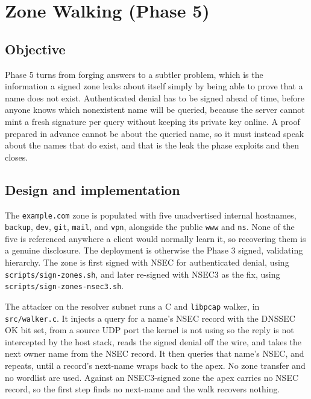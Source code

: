 \documentclass[11pt]{article}
\begin{document}
\clearpage

\section{Zone Walking (Phase 5)}

\subsection{Objective}

Phase 5 turns from forging answers to a subtler problem, which is the information a
signed zone leaks about itself simply by being able to prove that a name does not
exist. Authenticated denial has to be signed ahead of time, before anyone knows
which nonexistent name will be queried, because the server cannot mint a fresh
signature per query without keeping its private key online. A proof prepared in
advance cannot be about the queried name, so it must instead speak about the names
that do exist, and that is the leak the phase exploits and then closes.

\subsection{Design and implementation}

The \texttt{example.com} zone is populated with five unadvertised internal
hostnames, \texttt{backup}, \texttt{dev}, \texttt{git}, \texttt{mail}, and
\texttt{vpn}, alongside the public \texttt{www} and \texttt{ns}. None of the five
is referenced anywhere a client would normally learn it, so recovering them is a
genuine disclosure. The deployment is otherwise the Phase 3 signed, validating
hierarchy. The zone is first signed with NSEC for authenticated denial, using
\texttt{scripts/sign-zones.sh}, and later re-signed with NSEC3 as the fix, using
\texttt{scripts/sign-zones-nsec3.sh}.

The attacker on the resolver subnet runs a C and \texttt{libpcap} walker, in
\texttt{src/walker.c}. It injects a query for a name's NSEC record with the DNSSEC
OK bit set, from a source UDP port the kernel is not using so the reply is not
intercepted by the host stack, reads the signed denial off the wire, and takes the
next owner name from the NSEC record. It then queries that name's NSEC, and
repeats, until a record's next-name wraps back to the apex. No zone transfer and no
wordlist are used. Against an NSEC3-signed zone the apex carries no NSEC record, so
the first step finds no next-name and the walk recovers nothing.
\end{document}
